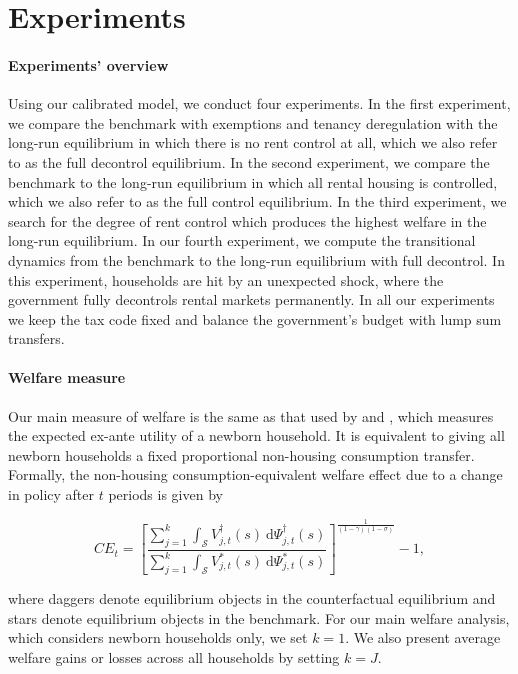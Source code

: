 \documentclass[parskip=full]{article}
\begin{document}
\section{Experiments}\label{section:experiments}

\paragraph{Experiments' overview} Using our calibrated model, we conduct four experiments. In the first experiment, we compare the benchmark with exemptions and tenancy deregulation with the long-run equilibrium in which there is no rent control at all, which we also refer to as the full decontrol equilibrium. In the second experiment, we compare the benchmark to the long-run equilibrium in which all rental housing is controlled, which we also refer to as the full control equilibrium. In the third experiment, we search for the degree of rent control which produces the highest welfare in the long-run equilibrium. In our fourth experiment, we compute the transitional dynamics from the benchmark to the long-run equilibrium with full decontrol. In this experiment, households are hit by an unexpected shock, where the government fully decontrols rental markets permanently. In all our experiments we keep the tax code fixed and balance the government's budget with lump sum transfers. 

\paragraph{Welfare measure} Our main measure of welfare is the same as that used by \citet{conesa-et-al} and \citet{gkkoc}, which measures the expected ex-ante utility of a newborn household. It is equivalent to giving all newborn households a fixed proportional non-housing consumption transfer. Formally, the non-housing consumption-equivalent welfare effect due to a change in policy after $t$ periods is given by

\begin{equation*}
  CE_{t} = \left[\frac{\sum_{j=1}^{k}\int_{\mathcal{S}}V^{\dagger}_{j,t}(s)\ \mathrm{d}\Psi^{\dagger}_{j,t}(s)}{\sum_{j=1}^{k}\int_{\mathcal{S}}V^*_{j,t}(s)\ \mathrm{d}\Psi^*_{j,t}(s)}\right]^{\frac{1}{(1-\gamma)(1-\sigma)}}-1,
\end{equation*}

\noindent where daggers denote equilibrium objects in the counterfactual equilibrium and stars denote equilibrium objects in the benchmark. For our main welfare analysis, which considers newborn households only, we set $k=1$. We also present average welfare gains or losses across all households by setting $k=J$.
\end{document}
